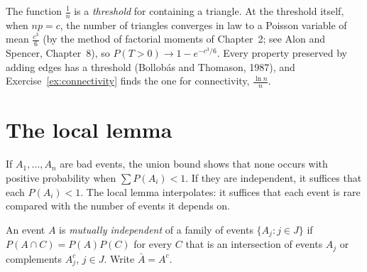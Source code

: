 The function $\frac1n$ is a \emph{threshold} for containing a triangle. At the threshold itself, when $np=c$, the number of triangles converges in law to a
Poisson variable of mean $\frac{c^3}6$ (by the method of factorial moments of Chapter~2; see Alon and Spencer, Chapter~8), so $P(T>0)\to1-e^{-c^3/6}$. Every property preserved by adding edges
has a threshold (Bollob\'as and Thomason, 1987), and Exercise~\ref{ex:connectivity} finds the one for connectivity, $\frac{\ln n}n$.

\section{The local lemma}

If $A_1,\dots,A_n$ are bad events, the union bound shows that none occurs with positive probability when $\sum P(A_i)<1$. If they are
independent, it suffices that each $P(A_i)<1$. The local lemma interpolates: it suffices that each event is rare compared with the
number of events it depends on.

An event $A$ is \emph{mutually independent} of a family of events $\{A_j:j\in J\}$ if $P(A\cap C)=P(A)P(C)$ for every $C$ that is an intersection of events
$A_j$ or complements $A_j^c$, $j\in J$. Write $\bar A=A^c$.


